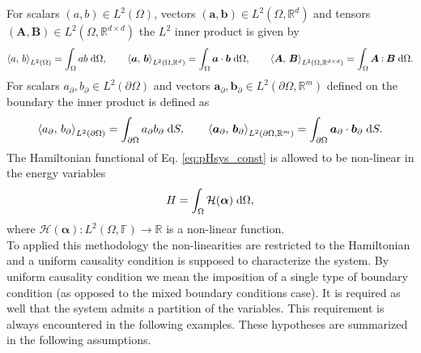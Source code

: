 For scalars $(a,b) \in L^2(\Omega)$, vectors $(\bm{a}, \bm{b})\in L^2(\Omega, \mathbb{R}^d)$ and tensors  $(\bm{A}, \bm{B}) \in L^2(\Omega,\mathbb{R}^{d\times d})$ the $L^2$ inner product is given by 
\begin{equation}
\inner[L^2(\Omega)]{a}{b} = \int_{\Omega} a b \d\Omega, \qquad \inner[L^2(\Omega, \mathbb{R}^d)]{\bm{a}}{\bm{b}} = \int_{\Omega} \bm{a} \cdot \bm{b} \d\Omega, \qquad \inner[L^2(\Omega, \mathbb{R}^{d \times d})]{\bm{A}}{\bm{B}} = \int_{\Omega} \bm{A} \cddot \bm{B} \d\Omega.
\end{equation} 
For scalars ${a}_\partial, {b}_\partial \in L^2(\partial\Omega)$ and vectors  $\bm{a}_\partial, \bm{b}_\partial \in L^2(\partial\Omega, \mathbb{R}^m)$ defined on the boundary the inner product is defined as
\begin{equation}
\inner[L^2(\partial\Omega)]{a_\partial}{b_\partial} = \int_{\partial\Omega} a_\partial b_\partial \d{S}, \qquad \inner[L^2(\partial\Omega, \mathbb{R}^m)]{\bm{a}_\partial}{\bm{b}_\partial} = \int_{\partial\Omega} \bm{a}_\partial \cdot \bm{b}_\partial \d{S}.
\end{equation} 
 The Hamiltonian functional of Eq. \eqref{eq:pHsys_const} is allowed to be non-linear in the energy variables
\begin{equation*}
H = \int_\Omega \mathcal{H}(\bm{\alpha}) \d\Omega,
\end{equation*}
where $\mathcal{H}(\bm{\alpha}): L^2(\Omega, \mathbb{F}) \rightarrow \mathbb{R}$ is a non-linear function.
\\

To applied this methodology the non-linearities are restricted to the Hamiltonian and a uniform causality condition is supposed to characterize the system. By uniform causality condition we mean the imposition of a single type of boundary condition \cite{kotyczka2019numerical} (as opposed to the mixed boundary conditions case). It is required as well that the system admits a partition of the variables. This requirement is always encountered in the following examples. These hypotheses are summarized in the following assumptions.

